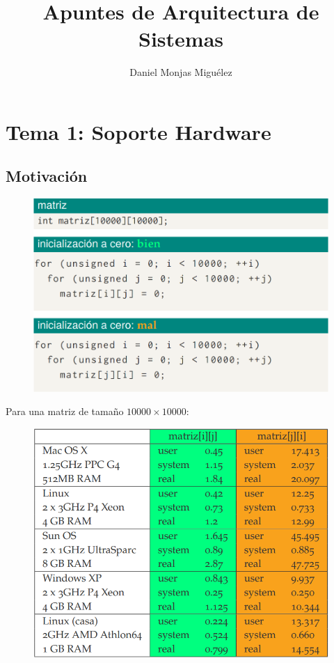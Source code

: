 \documentclass{article}
\author{Daniel Monjas Miguélez}
\title{Apuntes de Arquitectura de Sistemas}
\begin{document}
\maketitle

\newpage

\tableofcontents

\newpage

\section{Tema 1: Soporte Hardware}
\subsection{Motivación}
\begin{figure}[h]
\centering
\includegraphics[scale=0.8,width=\textwidth]{gestion_memoria.png}
\end{figure}
\newpage

Para una matriz de tamaño $10000\times 10000$:
\begin{figure}[h]
\centering
\includegraphics[scale=0.8,width=\textwidth]{time.png}
\end{figure}
\end{document}

